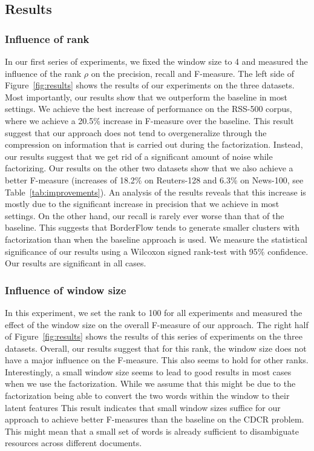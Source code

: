 \subsection{Results}

\subsubsection{Influence of rank}
In our first series of experiments, we fixed the window size to 4 and measured the influence of the rank $\rho$ on the precision, recall and F-measure. 
The left side of Figure~\ref{fig:results} shows the results of our experiments on the three datasets.
Most importantly, our results show that we outperform the baseline in most settings.
We achieve the best increase of performance on the RSS-500 corpus, where we achieve a 20.5\% increase in F-measure over the baseline.
This result suggest that our approach does not tend to overgeneralize through the compression on information that is carried out during the factorization.
Instead, our results suggest that we get rid of a significant amount of noise while factorizing.
Our results on the other two datasets show that we also achieve a better F-measure (increases of 18.2\% on Reuters-128 and 6.3\% on News-100, see Table~\ref{tab:improvements}). 
An analysis of the results reveals that this increase is mostly due to the significant increase in precision that we achieve in most settings.
On the other hand, our recall is rarely ever worse than that of the baseline.
This suggests that BorderFlow tends to generate smaller clusters with factorization than when the baseline approach is used.
We measure the statistical significance of our results using a Wilcoxon signed rank-test with 95\% confidence.
Our results are significant in all cases.%

\subsubsection{Influence of window size}
In this experiment, we set the rank to 100 for all experiments and measured the effect of the window size on the overall F-measure of our approach.
The right half of Figure~\ref{fig:results} shows the results of this series of experiments on the three datasets.
Overall, our results suggest that for this rank, the window size does not have a major influence on the F-measure. 
This also seems to hold for other ranks.
Interestingly, a small window size seems to lead to good results in most cases when we use the factorization. While we assume that this might be due to the factorization being able to convert the two words within the window to their latent features    
This result indicates that small window sizes suffice for our approach to achieve better F-measures than the baseline on the CDCR problem.
This might mean that a small set of words is already sufficient to disambiguate resources across different documents.


